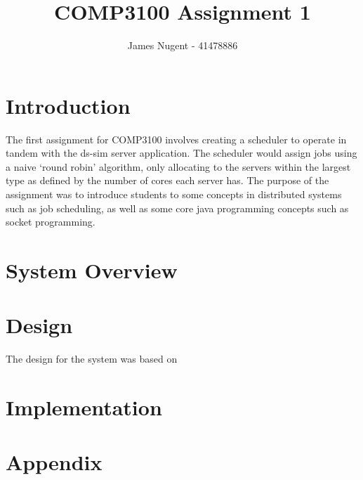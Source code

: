 \documentclass[12pt, letterpaper]{article}
\title{COMP3100 Assignment 1}
\author{James Nugent - 41478886}
\begin{document}
\maketitle
\section*{Introduction}
The first assignment for COMP3100 involves creating a scheduler to operate in tandem with the ds-sim server application.
The scheduler would assign jobs using a naive `round robin' algorithm, only allocating to the servers within the largest type as defined by the number of cores each server has.
The purpose of the assignment was to introduce students to some concepts in distributed systems such as job scheduling, as well as some core java programming concepts such as socket programming.
\section*{System Overview}
 
\section*{Design}
The design for the system was based on 
\section*{Implementation}
\section*{Appendix}
\end{document}

